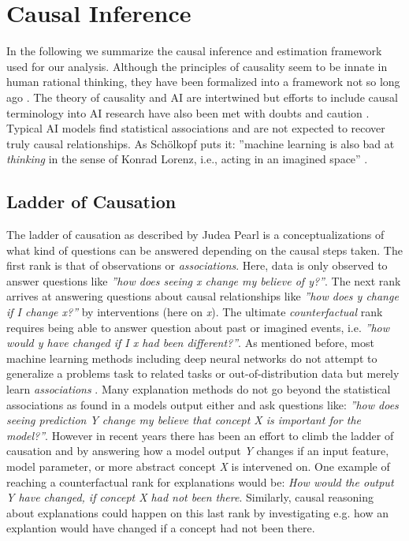\section{Causal Inference}
In the following we summarize the causal inference and estimation framework used for our analysis. 
Although the principles of causality seem to be innate in human rational thinking, they have been formalized into a framework not so long ago \cite{Spirtes1993, Halpern2005, Pearl2009, Peters2017}. The theory of causality and AI are intertwined but efforts to include causal terminology into AI research have also been met with doubts and caution \cite{Schoelkopf2019}. Typical AI models find statistical associations and are not expected to recover truly causal relationships. As Schölkopf puts it: ''machine learning is also bad at \textit{thinking} in the sense of Konrad Lorenz, i.e., acting in an imagined space'' \cite{Schoelkopf2019}.

\subsection{Ladder of Causation}
The ladder of causation as described by Judea Pearl \cite{Pearl2009} is a conceptualizations of what kind of questions can be answered depending on the causal steps taken.
The first rank is that of observations or \textit{associations}. Here, data is only observed to answer questions like \textit{''how does seeing x change my believe of y?''}.
The next rank arrives at answering questions about causal relationships like \textit{''how does y change if I change x?''} by interventions (here on \textit{x}). The ultimate \textit{counterfactual} rank requires being able to answer question about past or imagined events, i.e. \textit{''how would y have changed if I x had been different?''}.
As mentioned before, most machine learning methods including deep neural networks do not attempt to generalize a problems task to related tasks or out-of-distribution data but merely learn \textit{associations} \cite{Schoelkopf2019}. Many explanation methods do not go beyond the statistical associations as found in a models output either and ask questions like: \textit{''how does seeing prediction Y change my believe that concept X is important for the model?''}. However in recent years there has been an effort to climb the ladder of causation and by answering how a model output \textit{Y} changes if an input feature, model parameter, or more abstract concept \textit{X} is intervened on. One example of reaching a counterfactual rank for explanations would be: \textit{How would the output Y have changed, if concept X had not been there}. Similarly, causal reasoning about explanations could happen on this last rank by investigating e.g. how an explantion would have changed if a concept had not been there. 

